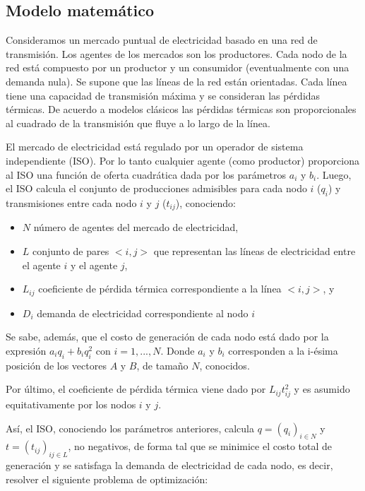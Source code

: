 \documentclass[twoside]{article}
\begin{document}
\begin{multicols}{2}
\section{Modelo matem\'atico}

Consideramos un mercado puntual de electricidad basado en una red de transmisi\'on. Los agentes de los mercados son los productores. Cada nodo de la red est\'a compuesto por un productor y un consumidor (eventualmente con una demanda nula). Se supone que las l\'ineas de la red est\'an orientadas. Cada l\'inea tiene una capacidad de transmisi\'on m\'axima y se consideran las p\'erdidas t\'ermicas. De acuerdo a modelos cl\'asicos las p\'erdidas t\'ermicas son proporcionales al cuadrado de la transmisi\'on que fluye a lo largo de la l\'inea. 

El mercado de electricidad est\'a regulado por un operador de sistema independiente (ISO). Por lo tanto cualquier agente (como productor) proporciona al ISO una funci\'on de oferta cuadr\'atica dada por los par\'ametros $a_i$ y $b_i$. Luego, el ISO calcula el conjunto de producciones admisibles para cada nodo $i$ ($q_i$) y transmisiones entre cada nodo $i$ y $j$ ($t_{ij}$), conociendo:

\begin{itemize}
\item $N$ n\'umero de agentes del mercado de electricidad,
\item $L$ conjunto de pares $<i,j>$ que representan las l\'ineas de electricidad entre el agente $i$ y el agente $j$,
\item $L_{ij}$ coeficiente de p\'erdida t\'ermica correspondiente a la l\'inea $<i,j>$, y
\item $D_i$ demanda de electricidad correspondiente al nodo $i$
\end{itemize}

Se sabe, adem\'as, que el costo de generaci\'on de cada nodo est\'a dado por la expresi\'on $a_i q_i + b_i q_i^2$ con $i = 1, ..., N$. Donde $a_i$ y $b_i$ corresponden a la i-\'esima posici\'on de los vectores $A$ y $B$, de tama\~no $N$, conocidos. 

Por \'ultimo, el coeficiente de p\'erdida t\'ermica viene dado por $L_{ij}t_{ij}^2$ y es asumido equitativamente por los nodos $i$ y $j$.  

As\'i, el ISO, conociendo los par\'ametros anteriores, calcula $q = (q_i)_{i \in N}$ y $t = (t_{ij})_{ij \in L}$, no negativos, de forma tal que se minimice el costo total de generaci\'on y se satisfaga la demanda de electricidad de cada nodo, es decir, resolver el siguiente problema de optimizaci\'on:


\end{multicols}
\end{document}
